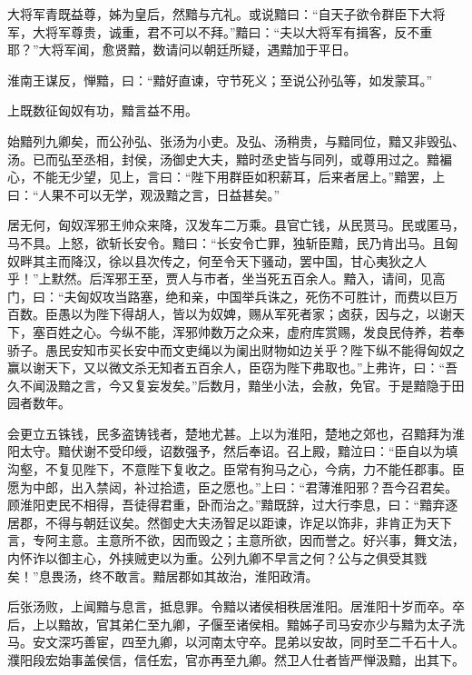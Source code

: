 \documentclass[12pt,UTF8]{ctexbook}
\begin{document}
大将军青既益尊，姊为皇后，然黯与亢礼。或说黯曰：“自天子欲令群臣下大将军，大将军尊贵，诚重，君不可以不拜。”黯曰：“夫以大将军有揖客，反不重耶？”大将军闻，愈贤黯，数请问以朝廷所疑，遇黯加于平日。



淮南王谋反，惮黯，曰：“黯好直谏，守节死义；至说公孙弘等，如发蒙耳。”



上既数征匈奴有功，黯言益不用。



始黯列九卿矣，而公孙弘、张汤为小吏。及弘、汤稍贵，与黯同位，黯又非毁弘、汤。已而弘至丞相，封侯，汤御史大夫，黯时丞史皆与同列，或尊用过之。黯褊心，不能无少望，见上，言曰：“陛下用群臣如积薪耳，后来者居上。”黯罢，上曰：“人果不可以无学，观汲黯之言，日益甚矣。”



居无何，匈奴浑邪王帅众来降，汉发车二万乘。县官亡钱，从民贳马。民或匿马，马不具。上怒，欲斩长安令。黯曰：“长安令亡罪，独斩臣黯，民乃肯出马。且匈奴畔其主而降汉，徐以县次传之，何至令天下骚动，罢中国，甘心夷狄之人乎！”上默然。后浑邪王至，贾人与市者，坐当死五百余人。黯入，请间，见高门，曰：“夫匈奴攻当路塞，绝和亲，中国举兵诛之，死伤不可胜计，而费以巨万百数。臣愚以为陛下得胡人，皆以为奴婢，赐从军死者家；卤获，因与之，以谢天下，塞百姓之心。今纵不能，浑邪帅数万之众来，虚府库赏赐，发良民侍养，若奉骄子。愚民安知市买长安中而文吏绳以为阑出财物如边关乎？陛下纵不能得匈奴之赢以谢天下，又以微文杀无知者五百余人，臣窃为陛下弗取也。”上弗许，曰：“吾久不闻汲黯之言，今又复妄发矣。”后数月，黯坐小法，会赦，免官。于是黯隐于田园者数年。



会更立五铢钱，民多盗铸钱者，楚地尤甚。上以为淮阳，楚地之郊也，召黯拜为淮阳太守。黯伏谢不受印绶，诏数强予，然后奉诏。召上殿，黯泣曰：“臣自以为填沟壑，不复见陛下，不意陛下复收之。臣常有狗马之心，今病，力不能任郡事。臣愿为中郎，出入禁闼，补过拾遗，臣之愿也。”上曰：“君薄淮阳邪？吾今召君矣。顾淮阳吏民不相得，吾徒得君重，卧而治之。”黯既辞，过大行李息，曰：“黯弃逐居郡，不得与朝廷议矣。然御史大夫汤智足以距谏，诈足以饰非，非肯正为天下言，专阿主意。主意所不欲，因而毁之；主意所欲，因而誉之。好兴事，舞文法，内怀诈以御主心，外挟贼吏以为重。公列九卿不早言之何？公与之俱受其戮矣！”息畏汤，终不敢言。黯居郡如其故治，淮阳政清。



后张汤败，上闻黯与息言，抵息罪。令黯以诸侯相秩居淮阳。居淮阳十岁而卒。卒后，上以黯故，官其弟仁至九卿，子偃至诸侯相。黯姊子司马安亦少与黯为太子洗马。安文深巧善宦，四至九卿，以河南太守卒。昆弟以安故，同时至二千石十人。濮阳段宏始事盖侯信，信任宏，官亦再至九卿。然卫人仕者皆严惮汲黯，出其下。
\end{document}
